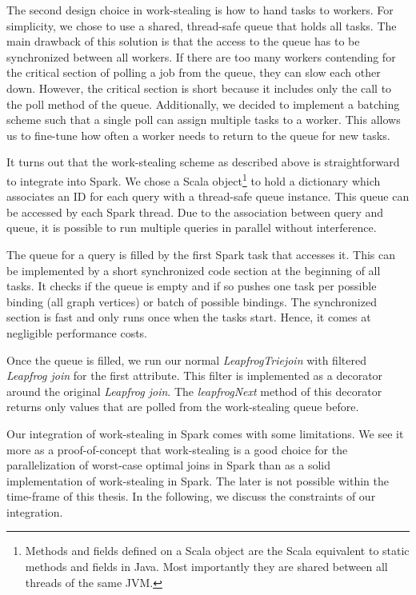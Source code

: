 The second design choice in work-stealing is how to hand tasks to workers.
For simplicity, we chose to use a shared, thread-safe queue that holds all tasks.
The main drawback of this solution is that the access to the queue has to be synchronized between all workers.
If there are too many workers contending for the critical section of polling a job from the queue, they can slow each other down.
However, the critical section is short because it includes only the call to the poll method of the queue.
Additionally, we decided to implement a batching scheme such that a single poll can assign multiple tasks to a worker.
This allows us to fine-tune how often a worker needs to return to the queue for new tasks.

It turns out that the work-stealing scheme as described above is straightforward to integrate into Spark.
We chose a Scala object\footnote{Methods and fields defined on a Scala object are the Scala equivalent to static methods and fields in
Java. Most importantly they are shared between all threads of the same JVM.} to hold a dictionary which associates an ID for each
query with a thread-safe queue instance.
This queue can be accessed by each Spark thread.
Due to the association between query and queue, it is possible to run multiple queries in parallel without interference.

The queue for a query is filled by the first Spark task that accesses it.
This can be implemented by a short synchronized code section at the beginning of all tasks.
It checks if the queue is empty and if so pushes one task per possible binding (all graph vertices) or batch of possible bindings.
The synchronized section is fast and only runs once when the tasks start.
Hence, it comes at negligible performance costs.

Once the queue is filled, we run our normal \textit{LeapfrogTriejoin} with filtered \textit{Leapfrog join} for the first attribute.
This filter is implemented as a decorator around the original \textit{Leapfrog join}.
The \textit{leapfrogNext} method of this decorator returns only values that are polled from the work-stealing queue before.

Our integration of work-stealing in Spark comes with some limitations.
We see it more as a proof-of-concept that work-stealing is a good choice for the parallelization of worst-case optimal joins in Spark than
as a solid implementation of work-stealing in Spark.
The later is not possible within the time-frame of this thesis.
In the following, we discuss the constraints of our integration.

